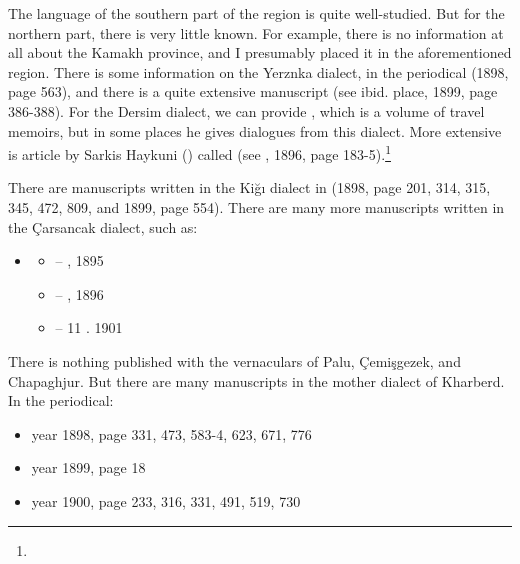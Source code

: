 The language of the southern part of the region is quite well-studied. But for the northern part, there is very little known. For example, there is no information at all about the Kamakh province, and I presumably placed it in the aforementioned region. There is some information on the Yerznka dialect, in the periodical  (1898, page 563), and there is a quite extensive manuscript (see ibid. place, 1899, page 386-388). For the Dersim dialect, we can provide \citet{Antranik-1900-Dersim}, which is a volume of travel memoirs, but in some places he gives dialogues from this dialect. More extensive is article by Sarkis Haykuni () called  (see , 1896, page 183-5).\footnote{} 
 
{\litoverview}

There are manuscripts written in the Kiğı dialect in  (1898, page 201, 314, 315, 345, 472, 809, and 1899, page 554). There are many more manuscripts written in the Çarsancak dialect, such as:


\begin{itemize}
	\item {}
	\begin{itemize}
		\item – , 1895
		\item – , 1896
		\item – 11 . 1901
	\end{itemize}
\end{itemize}

\begin{adjarianpage}\label{page:168}\end{adjarianpage}%

There is nothing published with the vernaculars of Palu, Çemişgezek, and Chapaghjur. But there are many manuscripts in the mother dialect of Kharberd. In the  periodical: 
\begin{itemize}
	\item year 1898, page 331, 473, 583-4, 623, 671, 776
	\item year 1899, page 18
	\item year 1900, page 233, 316, 331, 491, 519, 730
	
\end{itemize}

